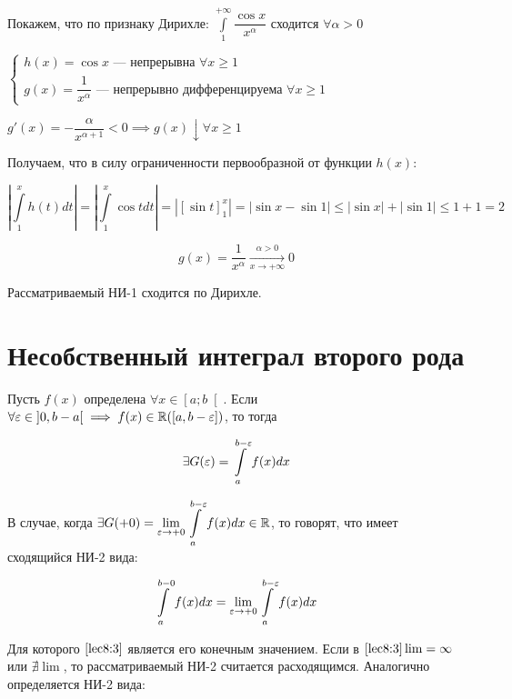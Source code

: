 \documentclass[../../main.tex]{subfiles}
\begin{document}
\begin{exmp}
 Покажем, что по признаку Дирихле: 
 $\displaystyle\int\limits_{1}^{+\infty}\dfrac{\cos{x}}{x^{\alpha}}$ сходится 
 $\forall \alpha > 0$
 
 $\begin{cases}
 h(x) = \cos{x} \text{~--- непрерывна } \forall x \geq 1\\
 g(x) = \dfrac{1}{x^{\alpha}} \text{~--- непрерывно дифференцируема } \forall 
 x \geq 1
 \end{cases}$
 
 $g'(x) = -\dfrac{\alpha}{x^{\alpha + 1}} < 0 \implies g(x) \downarrow \forall 
 x \geq 1$
 
 Получаем, что в силу ограниченности первообразной от функции $h(x)$:
 
 \[\left| \int\limits_{1}^{x}h(t)dt\right| = 
 \left|\int\limits_{1}^{x}\cos{t}dt\right| = \left| \left[ 
 \sin{t}\right]_{1}^{x} \right| = \left| \sin{x} - \sin{1} \right| \leq \left| 
 \sin{x} \right| + \left| \sin{1} \right| \leq 1 + 1 = 2\]
 
 \[g(x) = \dfrac{1}{x^{\alpha}} \xrightarrow[x \to +\infty]{\alpha > 0} 0\]
 
 Рассматриваемый НИ-1 сходится по Дирихле.
 \end{exmp}
 
 \section{Несобственный интеграл второго рода}
 
 Пусть $f(x)$ определена $\forall x \in \left[a; b \right[$. Если $\forall 
 \varepsilon \in \left] 0, b - a \right[ \implies f(x) \in \mathbb{R}(\left[a, b - 
 \varepsilon\right])$, то тогда

\begin{equation}\label{lec8:2}
\exists G(\varepsilon) = \displaystyle\int\limits_{a}^{b - \varepsilon}f(x)dx 
\end{equation}

В случае, когда $\exists G(+0) = \underset{\varepsilon \to +0}\lim 
\displaystyle\int\limits_{a}^{b - \varepsilon}f(x)dx \in \mathbb{R}$, то говорят, что имеет 
сходящийся НИ-2 вида:

\begin{equation}\label{lec8:3}
\displaystyle\int\limits_{a}^{b - 0}f(x)dx = \underset{\varepsilon \to +0}\lim 
\displaystyle\int\limits_{a}^{b - \varepsilon}f(x)dx
\end{equation}

Для которого $\eqref{lec8:3}$ является его конечным значением. Если в 
$\eqref{lec8:3} \lim = \infty$ или $\nexists \lim$, то рассматриваемый НИ-2 
считается расходящимся. Аналогично определяется НИ-2 вида:
\end{document}

